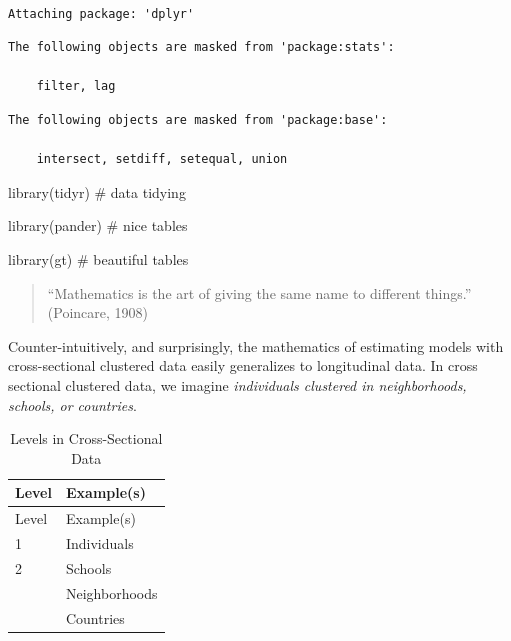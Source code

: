 \documentclass[
  letterpaper,
  DIV=11,
  numbers=noendperiod]{scrreprt}
\newenvironment{Shaded}{\begin{snugshade}}{\end{snugshade}}
\newcommand{\CommentTok}[1]{\textcolor[rgb]{0.37,0.37,0.37}{#1}}
\newcommand{\FunctionTok}[1]{\textcolor[rgb]{0.28,0.35,0.67}{#1}}
\newcommand{\NormalTok}[1]{\textcolor[rgb]{0.00,0.23,0.31}{#1}}
\begin{document}
\begin{verbatim}

Attaching package: 'dplyr'
\end{verbatim}

\begin{verbatim}
The following objects are masked from 'package:stats':

    filter, lag
\end{verbatim}

\begin{verbatim}
The following objects are masked from 'package:base':

    intersect, setdiff, setequal, union
\end{verbatim}

\begin{Shaded}
\begin{Highlighting}[]
\FunctionTok{library}\NormalTok{(tidyr) }\CommentTok{\# data tidying}

\FunctionTok{library}\NormalTok{(pander) }\CommentTok{\# nice tables}

\FunctionTok{library}\NormalTok{(gt) }\CommentTok{\# beautiful tables}
\end{Highlighting}
\end{Shaded}

\begin{quote}
``Mathematics is the art of giving the same name to different things.''
(Poincare, 1908)
\end{quote}

Counter-intuitively, and surprisingly, the mathematics of estimating
models with cross-sectional clustered data easily generalizes to
longitudinal data. In cross sectional clustered data, we imagine
\emph{individuals clustered in neighborhoods, schools, or countries}.

\hypertarget{tbl-levelscrosssectional}{}
\begin{longtable}[]{@{}ll@{}}
\caption{\label{tbl-levelscrosssectional}Levels in Cross-Sectional
Data}\tabularnewline
\toprule()
Level & Example(s) \\
\midrule()
\endfirsthead
\toprule()
Level & Example(s) \\
\midrule()
\endhead
1 & Individuals \\
2 & Schools \\
& Neighborhoods \\
& Countries \\
\bottomrule()
\end{longtable}
\end{document}
